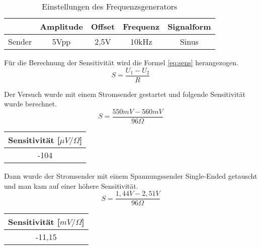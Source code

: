 \begin{table}[!h]
	\centering
	\begin{tabular}{|c|c|c|c|c|}
	\hline 
			& Amplitude		& Offset 	& Frequenz 		& Signalform		\\ 
	\hline 
	Sender	& 5Vpp		& 2,5V	& 10kHz		& Sinus		\\ 
	\hline 
	\end{tabular}
	\caption{Einstellungen des Frequenzsgenerators}
	\label{tb:einst_strom}
\end{table}

Für die Berechnung der Sensitivität wird die Formel \ref{eq:sens} herangezogen.
\begin{equation}
	S = \dfrac{U_1 - U_2}{R}
	\label{eq:sens}
\end{equation}

Der Versuch wurde mit einem Stromsender gestartet und folgende Sensitivität wurde berechnet.
\begin{equation}
	S = \dfrac{550mV - 560mV}{96\Omega}
	\label{eq:sens}
\end{equation}

\begin{table}[!h]
	\centering
	\begin{tabular}{|c|}
		\hline 
		Sensitivität [$\mu V / \Omega$]		\\ 
		\hline 
		-104		\\ 
		\hline 
	\end{tabular}
\end{table}

Dann wurde der Stromsender mit einem Spannungssender Single-Ended getauscht und man kam auf einer höhere Sensitivität.
\begin{equation}
	S = \dfrac{1,44V - 2,51V}{96\Omega}
	\label{eq:sens}
\end{equation}

\begin{table}[!h]
	\centering
	\begin{tabular}{|c|}
		\hline 
		Sensitivität [$mV / \Omega$]		\\ 
		\hline 
		-11,15		\\ 
		\hline 
	\end{tabular}
\end{table}





